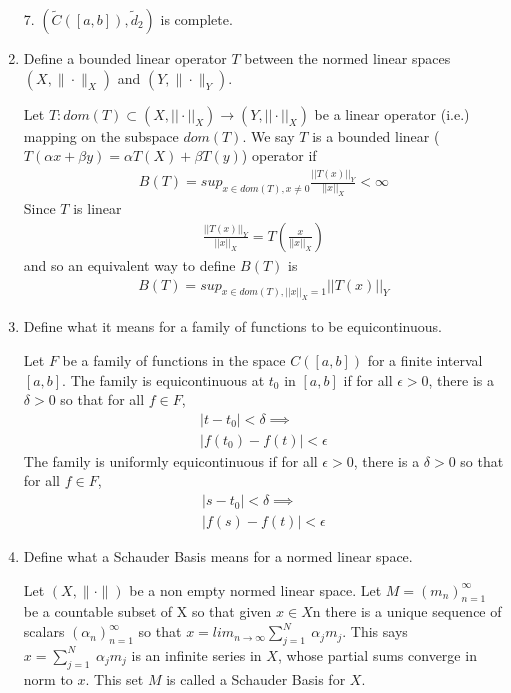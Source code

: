 \documentclass[11pt]{SelfArxOneColBMN}
\begin{document}
\begin{enumerate}
\begin{solution}
    7. $(\widetilde{C}([a,b]),\widetilde{d}_2)$ is complete.
  \end{solution}
  \item Define a bounded linear operator $T$ between the normed linear spaces $(X,\|\cdot\|_X)$ and $(Y,\|\cdot\|_Y)$.
  \begin{solution}
    Let $T: dom(T) \subset (X,||\cdot||_X) \rightarrow (Y,||\cdot||_X)$ be a linear operator (i.e.) mapping on the subspace $dom(T)$. We say $T$ is a bounded linear ($T(\alpha x + \beta y) = \alpha T(X) + \beta T(y)$) operator if
    \begin{eqnarray*}
      B(T) = sup_{x\in dom(T), x\neq0} \frac{||T(x)||_Y}{||x||_X} < \infty
    \end{eqnarray*}
    Since $T$ is linear
    \begin{eqnarray*}
      \frac{||T(x)||_Y}{||x||_X} = T(\frac{x}{||x||_X})
    \end{eqnarray*}
    and so an equivalent way to define $B(T)$ is
    \begin{eqnarray*}
      B(T) = sup_{x\in dom(T),||x||_X = 1}||T(x)||_Y
    \end{eqnarray*}
  \end{solution}
  \item Define what it means for a family of functions to be equicontinuous.
  \begin{solution}
    Let $F$ be a family of functions in the space $C([a,b])$ for a finite interval $[a,b]$. The family is equicontinuous at $t_0$ in $[a,b]$ if for all $\epsilon > 0$, there is a $\delta > 0$ so that for all $f \in F$,
    \begin{eqnarray*}
      |t - t_0| < \delta \implies \\
      |f(t_0) - f(t)| < \epsilon
    \end{eqnarray*}
    The family is uniformly equicontinuous if for all $\epsilon > 0$, there is a $\delta > 0$ so that for all $f \in F$,
    \begin{eqnarray*}
      |s - t_0| < \delta \implies\\
      |f(s) - f(t)| < \epsilon
    \end{eqnarray*}
  \end{solution}
  \item Define what a Schauder Basis means for a normed linear space.
  \begin{solution}
    Let $(X,\|\cdot\|)$ be a non empty normed linear space. Let $M = (m_n)_{n=1}^\infty$ be a countable subset of X so that given $x \in X$n there is a unique sequence of scalars $(\alpha_n)_{n=1}^\infty$ so that $x = lim_{n\rightarrow\infty}\sum_{j=1}^N\:\alpha_jm_j$. This says $x = \sum_{j=1}^N\:\alpha_jm_j$ is an infinite series in $X$, whose partial sums converge in norm to $x$. This set $M$ is called a Schauder Basis for $X$. 

\end{solution}
\end{enumerate}
\end{document}
